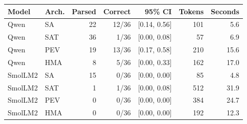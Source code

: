 \begin{tabular}{llrrrrr}
\toprule
Model & Arch. & Parsed & Correct & 95\% CI & Tokens & Seconds \\
\midrule
Qwen & SA & 22 & 12/36 & [0.14, 0.56] & 101 & 5.6 \\
Qwen & SAT & 36 & 1/36 & [0.00, 0.08] & 57 & 6.9 \\
Qwen & PEV & 19 & 13/36 & [0.17, 0.58] & 210 & 15.6 \\
Qwen & HMA & 8 & 5/36 & [0.00, 0.33] & 162 & 17.0 \\
SmolLM2 & SA & 15 & 0/36 & [0.00, 0.00] & 85 & 4.8 \\
SmolLM2 & SAT & 1 & 1/36 & [0.00, 0.08] & 512 & 31.9 \\
SmolLM2 & PEV & 0 & 0/36 & [0.00, 0.00] & 384 & 24.7 \\
SmolLM2 & HMA & 0 & 0/36 & [0.00, 0.00] & 192 & 12.3 \\
\bottomrule
\end{tabular}
